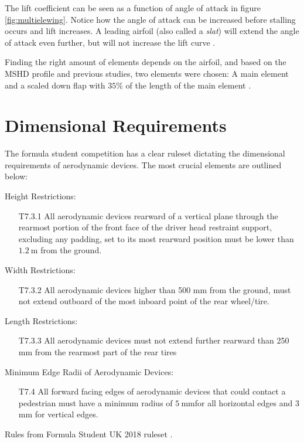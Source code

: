     The lift coefficient can be seen as a function of angle of attack in figure \ref{fig:multielewing}. Notice how the angle of attack can be increased before stalling occurs and lift increases. A leading airfoil (also called a \emph{slat}) will extend the angle of attack even further, but will not increase the lift curve \cite{jkatz}.

    Finding the right amount of elements depends on the airfoil, and based on the MSHD profile and previous studies, two elements were chosen: A main element and a scaled down flap with $35\%$ of the length of the main element \cite{winginitialangle}.

  \section{Dimensional Requirements}

    The formula student competition has a clear ruleset dictating the dimensional requirements of aerodynamic devices. The most crucial elements are outlined below:

    \begin{tcolorbox}[colframe=seapurple,colback=seapurple!1]
      Height Restrictions:
      \begin{itemize}
        \item[T7.3.1] All aerodynamic devices rearward of a vertical plane through the rearmost portion of the front face of the driver head restraint support, excluding any padding, set to its most rearward position must be lower than $\SI{1.2}{\metre}$ from the ground.
      \end{itemize}

      Width Restrictions:
      \begin{itemize}
       \item [T7.3.2] All aerodynamic devices higher than 500 mm from the ground, must not extend outboard of the most inboard point of the rear wheel/tire.
      \end{itemize}

      Length Restrictions:
      \begin{itemize}
        \item [T7.3.3] All aerodynamic devices must not extend further rearward than 250 mm from the rearmost part of the rear tires
      \end{itemize}

      Minimum Edge Radii of Aerodynamic Devices:
      \begin{itemize}
        \item[T7.4] All forward facing edges of aerodynamic devices that could contact a pedestrian must have a
      minimum radius of $\SI{5}{\milli\metre}$for all horizontal edges and 3 mm for vertical edges.
      \end{itemize}

      \hspace*{\fill}\tiny{Rules from Formula Student UK 2018 ruleset \cite{FSrules18}.}
    \end{tcolorbox}

